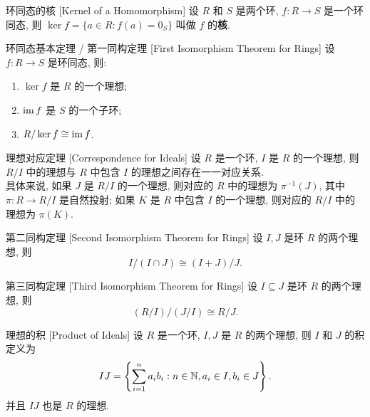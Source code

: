         \begin{dfn}
            {环同态的核}
            [Kernel of a Homomorphism]
            设 \(R\) 和 \(S\) 是两个环, \(f:R\to S\) 是一个环同态, 则 \(\ker f=\{a\in R: f(a)=0_S\}\) 叫做 \(f\) 的\textbf{核}.
        \end{dfn}

        \begin{thm}
            {环同态基本定理 / 第一同构定理}
            [First Isomorphism Theorem for Rings]
            设 \(f:R\to S\) 是环同态, 则:
            \begin{enumerate}
                \item \(\ker f\) 是 \(R\) 的一个理想;
                \item \(\operatorname{im} f\) 是 \(S\) 的一个子环;
                \item \(R/\ker f\cong \operatorname{im} f\).
            \end{enumerate}
        \end{thm}

        \begin{crl}
            {理想对应定理}
            [Correspondence for Ideals]
            设 \(R\) 是一个环, \(I\) 是 \(R\) 的一个理想, 则 \(R/I\) 中的理想与 \(R\) 中包含 \(I\) 的理想之间存在一一对应关系. \\
            具体来说, 如果 \(J\) 是 \(R/I\) 的一个理想, 则对应的 \(R\) 中的理想为 \(\pi^{-1}(J)\), 其中 \(\pi:R\to R/I\) 是自然投射; 如果 \(K\) 是 \(R\) 中包含 \(I\) 的一个理想, 则对应的 \(R/I\) 中的理想为 \(\pi(K)\).
        \end{crl}

        \begin{crl}
            {第二同构定理}
            [Second Isomorphism Theorem for Rings]
            设 \(I,J\) 是环 \(R\) 的两个理想, 则
            \[I/(I\cap J)\cong (I+J)/J.\]
        \end{crl}

        \begin{crl}
            {第三同构定理}
            [Third Isomorphism Theorem for Rings]
            设 \(I\subseteq J\) 是环 \(R\) 的两个理想, 则
            \[(R/I)/(J/I)\cong R/J.\]
        \end{crl}

        \begin{xmp}
            {理想的积}
            [Product of Ideals]
            设 \(R\) 是一个环, \(I,J\) 是 \(R\) 的两个理想, 则 \(I\) 和 \(J\) 的积定义为
            \[IJ=\left\{\sum_{i=1}^{n} a_i b_i: n\in\operatorname{\mathbb{N}}, a_i\in I, b_i\in J\right\}.\]
            并且 \(IJ\) 也是 \(R\) 的理想.
        \end{xmp}

